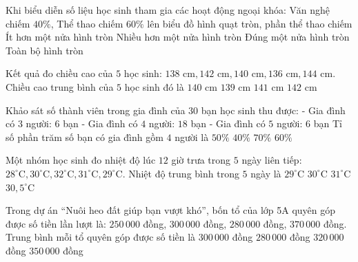 \begin{ex} %
Khi biểu diễn số liệu học sinh tham gia các hoạt động ngoại khóa: Văn nghệ chiếm $40\%$, Thể thao chiếm $60\%$ lên biểu đồ hình quạt tròn, phần thể thao chiếm
\choice
{Ít hơn một nửa hình tròn}
{\True Nhiều hơn một nửa hình tròn}
{Đúng một nửa hình tròn}
{Toàn bộ hình tròn}
\end{ex}

\begin{ex} %
Kết quả đo chiều cao của $5$ học sinh: $138\text{ cm}, 142\text{ cm}, 140\text{ cm}, 136\text{ cm}, 144\text{ cm}$. Chiều cao trung bình của $5$ học sinh đó là
\choice
{\True $140\text{ cm}$}
{$139\text{ cm}$}
{$141\text{ cm}$}
{$142\text{ cm}$}
\end{ex}

\begin{ex} %
Khảo sát số thành viên trong gia đình của $30$ bạn học sinh thu được:
- Gia đình có $3$ người: $6$ bạn
- Gia đình có $4$ người: $18$ bạn
- Gia đình có $5$ người: $6$ bạn
Tỉ số phần trăm số bạn có gia đình gồm $4$ người là
\choice
{$50\%$}
{$40\%$}
{$70\%$}
{\True $60\%$}
\end{ex}

\begin{ex} %
Một nhóm học sinh đo nhiệt độ lúc $12$ giờ trưa trong $5$ ngày liên tiếp: $28^\circ\text{C}, 30^\circ\text{C}, 32^\circ\text{C}, 31^\circ\text{C}, 29^\circ\text{C}$. Nhiệt độ trung bình trong $5$ ngày là
\choice
{$29^\circ\text{C}$}
{\True $30^\circ\text{C}$}
{$31^\circ\text{C}$}
{$30{,}5^\circ\text{C}$}
\end{ex}

\begin{ex} %
Trong dự án “Nuôi heo đất giúp bạn vượt khó”, bốn tổ của lớp 5A quyên góp được số tiền lần lượt là: $250\,000$ đồng, $300\,000$ đồng, $280\,000$ đồng, $370\,000$ đồng. Trung bình mỗi tổ quyên góp được số tiền là
\choice
{\True $300\,000$ đồng}
{$280\,000$ đồng}
{$320\,000$ đồng}
{$350\,000$ đồng}
\end{ex}


